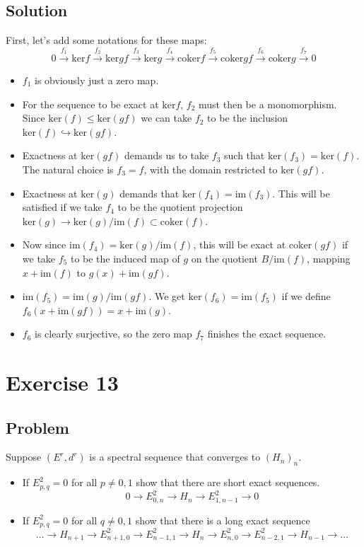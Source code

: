 \documentclass{article}
\begin{document}
\subsection*{Solution}
First, let's add some notations for these maps:
\begin{equation*}
0 \xrightarrow{f_1} \mathrm{ker}f \xrightarrow{f_2} \mathrm{ker}gf \xrightarrow{f_3} \mathrm{ker}g \xrightarrow{f_4} \mathrm{coker}f \xrightarrow{f_5} \mathrm{coker}gf \xrightarrow{f_6} \mathrm{coker}g \xrightarrow{f_7} 0 
\end{equation*}
\begin{itemize}
\item $f_1$ is obviously just a zero map. 
\item For the sequence to be exact at $\mathrm{ker} f$, $f_2$ must then be a monomorphism. 
Since $\mathrm{ker}(f) \leq \mathrm{ker}(gf)$ we can take $f_2$ to be the inclusion $\mathrm{ker}(f) \hookrightarrow \mathrm{ker}(gf)$. 
\item Exactness at $\mathrm{ker}(gf)$ demands us to take $f_3$ such that $\mathrm{ker}(f_3) = \mathrm{ker}(f)$. The natural choice is $f_3=f$, with the domain restricted to $\mathrm{ker}(gf)$.
\item Exactness at $\mathrm{ker}(g)$ demands that $\mathrm{ker}(f_4) = \mathrm{im}(f_3)$. This will be satisfied if we take $f_4$ to be the quotient projection $\mathrm{ker}(g) \to \mathrm{ker}(g)/\mathrm{im}(f) \subset \mathrm{coker}(f)$.
\item Now since $\mathrm{im}(f_4) = \mathrm{ker}(g)/\mathrm{im}(f)$, this will be exact at $\mathrm{coker}(gf)$ if we take $f_5$ to be the induced map of $g$ on the quotient $B/\mathrm{im}(f)$, mapping $x+\mathrm{im}(f)$ to $g(x)+\mathrm{im}(gf)$.
\item $\mathrm{im}(f_5) = \mathrm{im}(g) / \mathrm{im}(gf)$. We get $\mathrm{ker}(f_6) = \mathrm{im}(f_5)$ if we define $f_6(x + \mathrm{im}(gf)) = x + \mathrm{im}(g)$.
\item $f_6$ is clearly surjective, so the zero map $f_7$ finishes the exact sequence.
\end{itemize}


\section*{Exercise 13}
\subsection*{Problem}
Suppose $(E^r,d^r)$ is a spectral sequence that converges to $(H_n)_n$.
\begin{itemize}
\item If $E^2_{p,q} = 0$ for all $p \neq 0,1$ show that there are short exact sequences.
\begin{equation*}
0 \to E^2_{0,n} \to H_n \to E^2_{1,n-1} \to 0
\end{equation*}
\item If $E^2_{p,q} = 0$ for all $q \neq 0,1$ show that there is a long exact sequence
\begin{equation*}
\dots \to H_{n+1} \to E^2_{n+1,0} \to E^2_{n-1,1} \to H_n \to E^2_{n,0} \to E^2_{n-2,1} \to H_{n-1} \to \dots
\end{equation*}
\end{itemize}
\end{document}
